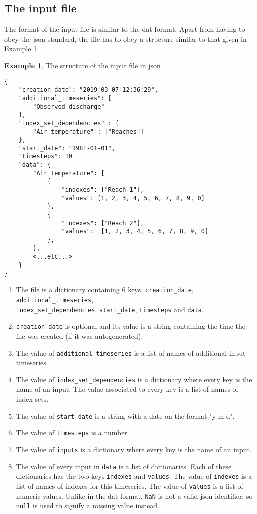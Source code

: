 \documentclass[11pt]{article}
\theoremstyle{definition}
\newtheorem{myexample}{Example}
\newenvironment{example}%
  {\begin{lrbox}{\examplebox}%
   \begin{minipage}{\dimexpr\linewidth-2\fboxsep}
   \begin{myexample}}%
  {\end{myexample}%
   \end{minipage}%
   \end{lrbox}%
   \begin{trivlist}
     \item[]\colorbox{silver}{\usebox\examplebox}
   \end{trivlist}}
\begin{document}
\subsection{The input file}
The format of the input file is similar to the dat format. Apart from having to obey the json standard, the file has to obey a structure similar to that given in Example \ref{ex:jsonin}

\begin{example}\label{ex:jsonin}
The structure of the input file in json
\begin{lstlisting}
{
	"creation_date": "2019-03-07 12:36:29",
	"additional_timeseries": [
		"Observed discharge"
	],
	"index_set_dependencies" : {
		"Air temperature" : ["Reaches"]
	},
	"start_date": "1981-01-01",
	"timesteps": 10
	"data": {
		"Air temperature": [
			{
				"indexes": ["Reach 1"],
				"values": [1, 2, 3, 4, 5, 6, 7, 8, 9, 0]
			},
			{
				"indexes": ["Reach 2"],
				"values":  [1, 2, 3, 4, 5, 6, 7, 8, 9, 0]
			},
		],
		<...etc...>
	}
}
\end{lstlisting}
\end{example}

\begin{enumerate}[i]
\item The file is a dictionary containing 6 keys, {\tt creation\_date}, {\tt additional\_timeseries}, \\{\tt index\_set\_dependencies}, {\tt start\_date}, {\tt timesteps} and {\tt data}.
\item {\tt creation\_date} is optional and its value is a string containing the time the file was created (if it was autogenerated).
\item The value of {\tt additional\_timeseries} is a list of names of additional input timeseries.
\item The value of {\tt index\_set\_dependencies} is a dictionary where every key is the name of an input. The value associated to every key is a list of names of index sets.
\item The value of {\tt start\_date} is a string with a date on the format "y-m-d".
\item The value of {\tt timesteps} is a number.
\item The value of {\tt inputs} is a dictionary where every key is the name of an input.
\item The value of every input in {\tt data} is a list of dictionaries. Each of these dictionaries has the two keys {\tt indexes} and {\tt values}. The value of {\tt indexes} is a list of names of indexes for this timeseries. The value of {\tt values} is a list of numeric values. Unlike in the dat format, {\tt NaN} is not a valid json identifier, so {\tt null} is used to signify a missing value instead.
\end{enumerate}



\end{document}
